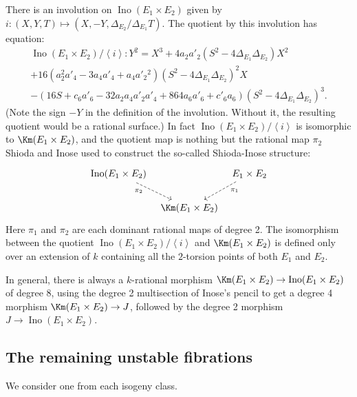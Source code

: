 \documentclass{article}
\newcommand{\class}[1]{\left< #1 \right>}
\newcommand{\Ino}{\operatorname{{Ino}}}
\begin{document}
There is an involution on  $\Ino(E_{1}\times E_{2})$ given by $i:(X,Y,T)\mapsto (X,-Y,\Delta_{E_{2}}/\Delta_{E_{1}}T)$.  The quotient by this involution has equation:
\begin{multline}\label{eq:InoseKummer}
\Ino(E_{1}\times E_{2})/\class{i}: 
Y^2 = X^3 + 4a_{2} a'_{2} (S^2 - 4\Delta_{E_{1}}\Delta_{E_{2}}) X^2
\\
+ 16(a_{2}^2 a'_{4} - 3 a_{4}a'_{4} + a_{4} a'_{2}{}^2)  
(S^2 - 4\Delta_{E_{1}}\Delta_{E_{2}})^{2} X
\\
-
(16 S + c_{6} a'_{6} - 32 a_{2} a_{4} a'_{2} a'_{4} + 864 a_{6} a'_{6}
+ c'_{6} a_{6}  )(S^2 - 4\Delta_{E_{1}}\Delta_{E_{2}})^3.
\end{multline}
(Note the sign $-Y$ in the definition of the involution.  Without it, the resulting quotient would be a rational surface.)
In fact $\Ino(E_1\times E_2)/\class{i}$ is isomorphic to $\Km(E_1\times E_2)$, and the quotient map is nothing but the rational map $\pi_{2}$ Shioda and Inose \cite{Shioda-Inose} used to construct the so-called Shioda-Inose structure:
\[
\begin{tikzcd}[column sep = tiny]
\Ino(E_{1}\times E_{2}) \arrow[rd, "\pi_2"' near start, dashed] &          & E_{1}\times E_{2} \arrow[ld, "\pi_1" near start, dashed] \\
                               &\Km(E_{1}\times E_{2}) &                                 
\end{tikzcd}
\]
Here $\pi_1$ and $\pi_2$ are each dominant rational maps of degree 2.  
The isomorphism between the quotient $\Ino(E_{1}\times E_{2})/\class{i}$ and $\Km(E_{1}\times E_{2})$ is defined only over an extension of $k$ containing all the $2$-torsion points of both $E_{1}$ and $E_{2}$.

In general, there is always a $k$-rational morphism $\Km(E_1\times E_2)\to \Ino(E_1\times E_2)$ of degree 8, using the degree 2 multisection of Inose's pencil to get a degree 4 morphism $\Km(E_1\times E_2)\to J$, followed by the degree 2 morphism $J\to \Ino(E_1\times E_2)$.  

\subsection{The remaining unstable fibrations}

We consider one from each isogeny class.
\end{document}
